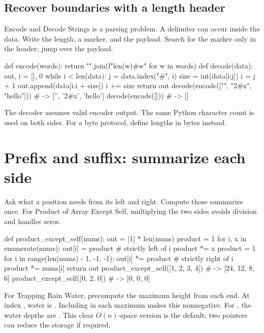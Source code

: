 \documentclass[11pt]{article}
\newcommand{\cd}[1]{{\frenchspacing\texttt{\detokenize{#1}}}}
\begin{document}
\subsection{Recover boundaries with a length header}
Encode and Decode Strings is a parsing problem. A delimiter can occur inside the data.
Write the length, a marker, and the payload. Search for the marker only in the header; jump over the payload.
\par\noindent\begin{minipage}{\linewidth}
\hypertarget{example-start-15}{}
\begin{pyex}
def encode(words):
    return "".join(f"{len(w)}#{w}" for w in words)
def decode(data):
    out, i = [], 0
    while i < len(data):
        j = data.index("#", i)
        size = int(data[i:j])
        i = j + 1
        out.append(data[i:i + size])
        i += size
    return out
decode(encode(["", "2#x", "hello"]))   # -> ['', '2#x', 'hello']
decode(encode([]))                    # -> []
\end{pyex}
\hypertarget{example-end-15}{}
\end{minipage}\par
The decoder assumes valid encoder output. The same Python character count is used on both sides.
For a byte protocol, define lengths in bytes instead.

\section{Prefix and suffix: summarize each side}\label{sec:prefix}
Ask what a position needs from its left and right. Compute those summaries once.
For Product of Array Except Self, multiplying the two sides avoids division and handles zeros.
\par\noindent\begin{minipage}{\linewidth}
\hypertarget{example-start-16}{}
\begin{pyex}
def product_except_self(nums):
    out = [1] * len(nums)
    product = 1
    for i, x in enumerate(nums):
        out[i] = product              # strictly left of i
        product *= x
    product = 1
    for i in range(len(nums) - 1, -1, -1):
        out[i] *= product             # strictly right of i
        product *= nums[i]
    return out
product_except_self([1, 2, 3, 4])     # -> [24, 12, 8, 6]
product_except_self([0, 2, 0])        # -> [0, 0, 0]
\end{pyex}
\hypertarget{example-end-16}{}
\end{minipage}\par
For Trapping Rain Water, precompute the maximum height from each end.
At index \cd{i}, water is \cd{min(left_max[i], right_max[i]) - height[i]}.
Including \cd{height[i]} in each maximum makes this nonnegative.
For \cd{[3, 0, 2, 0, 4]}, the water depths are \cd{[0, 3, 1, 3, 0]}.
This clear \(O(n)\)-space version is the default; two pointers can reduce the storage if required.
\end{document}

